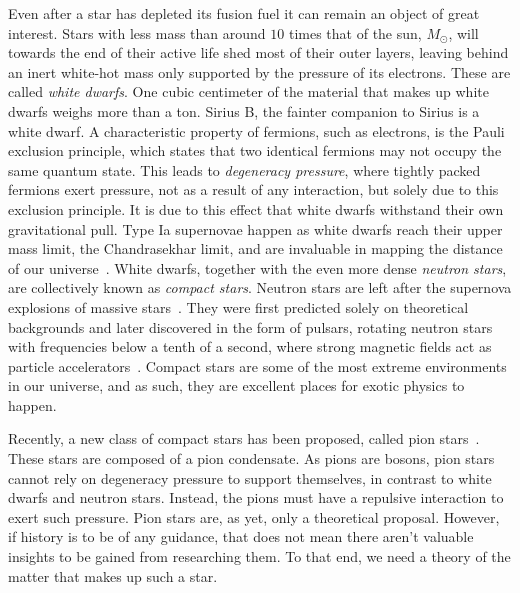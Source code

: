 Even after a star has depleted its fusion fuel it can remain an object of great interest.
Stars with less mass than around $10$ times that of the sun, $M_\odot$, will towards the end of their active life shed most of their outer layers, leaving behind an inert white-hot mass only supported by the pressure of its electrons.
These are called \emph{white dwarfs}.
One cubic centimeter of the material that makes up white dwarfs weighs more than a ton.
Sirius B, the fainter companion to Sirius is a white dwarf.
A characteristic property of fermions, such as electrons, is the Pauli exclusion principle, which states that two identical fermions may not occupy the same quantum state.
This leads to \emph{degeneracy pressure}, where tightly packed fermions exert pressure, not as a result of any interaction, but solely due to this exclusion principle.
It is due to this effect that white dwarfs withstand their own gravitational pull.
Type Ia supernovae happen as white dwarfs reach their upper mass limit, the Chandrasekhar limit, and are invaluable in mapping the distance of our universe~\autocite{carrollSpacetimeGeometryIntroduction2019}.
White dwarfs, together with the even more dense \emph{neutron stars}, are collectively known as \emph{compact stars}.
Neutron stars are left after the supernova explosions of massive stars~\autocite{prialnikIntroductionTheoryStellar2000}.
They were first predicted solely on theoretical backgrounds and later discovered in the form of pulsars, rotating neutron stars with frequencies below a tenth of a second, where strong magnetic fields act as particle accelerators~\autocite{prialnikIntroductionTheoryStellar2000}.
Compact stars are some of the most extreme environments in our universe, and as such, they are excellent places for exotic physics to happen.

Recently, a new class of compact stars has been proposed, called pion stars~\autocite{andersenBoseEinsteinCondensationPion2018,brandtNewClassCompact2018,carignanoScrutinizingPionCondensed2017}.
These stars are composed of a pion condensate.
As pions are bosons, pion stars cannot rely on degeneracy pressure to support themselves, in contrast to white dwarfs and neutron stars.
Instead, the pions must have a repulsive interaction to exert such pressure.
Pion stars are, as yet, only a theoretical proposal.
However, if history is to be of any guidance, that does not mean there aren't valuable insights to be gained from researching them.
To that end, we need a theory of the matter that makes up such a star.




